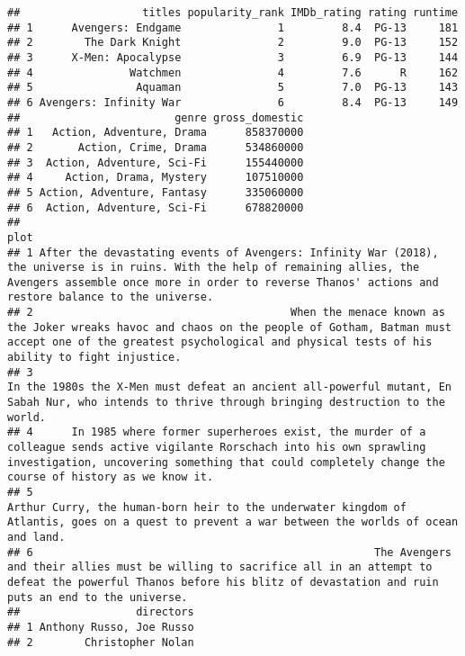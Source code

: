 \documentclass[]{article}
\begin{document}
\begin{verbatim}
##                   titles popularity_rank IMDb_rating rating runtime
## 1      Avengers: Endgame               1         8.4  PG-13     181
## 2        The Dark Knight               2         9.0  PG-13     152
## 3      X-Men: Apocalypse               3         6.9  PG-13     144
## 4               Watchmen               4         7.6      R     162
## 5                Aquaman               5         7.0  PG-13     143
## 6 Avengers: Infinity War               6         8.4  PG-13     149
##                        genre gross_domestic
## 1   Action, Adventure, Drama      858370000
## 2       Action, Crime, Drama      534860000
## 3  Action, Adventure, Sci-Fi      155440000
## 4     Action, Drama, Mystery      107510000
## 5 Action, Adventure, Fantasy      335060000
## 6  Action, Adventure, Sci-Fi      678820000
##                                                                                                                                                                                                                                   plot
## 1 After the devastating events of Avengers: Infinity War (2018), the universe is in ruins. With the help of remaining allies, the Avengers assemble once more in order to reverse Thanos' actions and restore balance to the universe.
## 2                                        When the menace known as the Joker wreaks havoc and chaos on the people of Gotham, Batman must accept one of the greatest psychological and physical tests of his ability to fight injustice.
## 3                                                                                    In the 1980s the X-Men must defeat an ancient all-powerful mutant, En Sabah Nur, who intends to thrive through bringing destruction to the world.
## 4      In 1985 where former superheroes exist, the murder of a colleague sends active vigilante Rorschach into his own sprawling investigation, uncovering something that could completely change the course of history as we know it.
## 5                                                                                      Arthur Curry, the human-born heir to the underwater kingdom of Atlantis, goes on a quest to prevent a war between the worlds of ocean and land.
## 6                                                     The Avengers and their allies must be willing to sacrifice all in an attempt to defeat the powerful Thanos before his blitz of devastation and ruin puts an end to the universe.
##                  directors
## 1 Anthony Russo, Joe Russo
## 2        Christopher Nolan

\end{verbatim}
\end{document}
